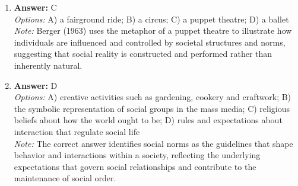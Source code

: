 \documentclass[12pt]{article}
\begin{document}
\begin{enumerate}[label=\arabic*.]
\item \textbf{Answer:} C
\\ \textit{Options:} A) a fairground ride; B) a circus; C) a puppet theatre; D) a ballet
\\ \textit{Note:} Berger (1963) uses the metaphor of a puppet theatre to illustrate how individuals are influenced and controlled by societal structures and norms, suggesting that social reality is constructed and performed rather than inherently natural.
\item \textbf{Answer:} D
\\ \textit{Options:} A) creative activities such as gardening, cookery and craftwork; B) the symbolic representation of social groups in the mass media; C) religious beliefs about how the world ought to be; D) rules and expectations about interaction that regulate social life
\\ \textit{Note:} The correct answer identifies social norms as the guidelines that shape behavior and interactions within a society, reflecting the underlying expectations that govern social relationships and contribute to the maintenance of social order.
\end{enumerate}
\end{document}
